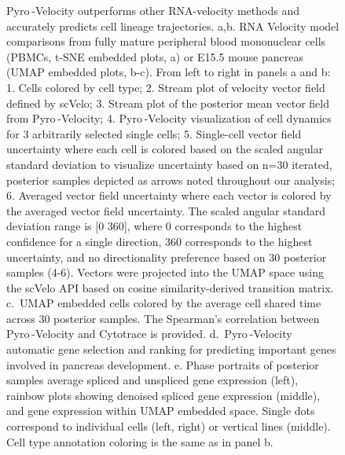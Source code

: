\documentclass[
  sn-mathphys-num,
  lineno,
  twocolumn]{sn-jnl}
\begin{document}
\begin{figure}


\caption{\label{fig-model-results}Pyro -Velocity outperforms other
RNA-velocity methods and accurately predicts cell lineage trajectories.
a,b. RNA Velocity model comparisons from fully mature peripheral blood
mononuclear cells (PBMCs, t-SNE embedded plots, a) or E15.5 mouse
pancreas (UMAP embedded plots, b-c). From left to right in panels a and
b: 1. Cells colored by cell type; 2. Stream plot of velocity vector
field defined by scVelo; 3. Stream plot of the posterior mean vector
field from Pyro -Velocity; 4. Pyro -Velocity visualization of cell
dynamics for 3 arbitrarily selected single cells; 5. Single-cell vector
field uncertainty where each cell is colored based on the scaled angular
standard deviation to visualize uncertainty based on n=30 iterated,
posterior samples depicted as arrows noted throughout our analysis; 6.
Averaged vector field uncertainty where each vector is colored by the
averaged vector field uncertainty. The scaled angular standard deviation
range is {[}0 360{]}, where 0 corresponds to the highest confidence for
a single direction, 360 corresponds to the highest uncertainty, and no
directionality preference based on 30 posterior samples (4-6). Vectors
were projected into the UMAP space using the scVelo API based on cosine
similarity-derived transition matrix. c.~UMAP embedded cells colored by
the average cell shared time across 30 posterior samples. The Spearman's
correlation between Pyro -Velocity and Cytotrace is provided.
d.~Pyro -Velocity automatic gene selection and ranking for predicting
important genes involved in pancreas development. e. Phase portraits of
posterior samples average spliced and unspliced gene expression (left),
rainbow plots showing denoised spliced gene expression (middle), and
gene expression within UMAP embedded space. Single dots correspond to
individual cells (left, right) or vertical lines (middle). Cell type
annotation coloring is the same as in panel b.}

\end{figure}%
\end{document}
